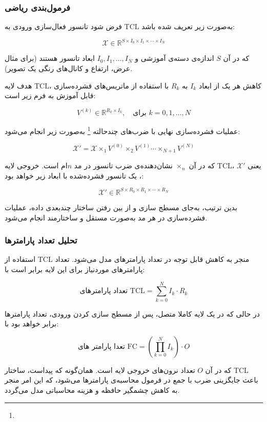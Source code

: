 \subsubsection*{فرمول‌بندی ریاضی}

فرض شود تانسور فعال‌سازی ورودی به TCL به‌صورت زیر تعریف شده باشد:

\[
\mathcal{X} \in \mathbb{R}^{S \times I_0 \times I_1 \times \cdots \times I_N}
\]

که در آن $S$ اندازه‌ی دسته‌ی آموزشی و $I_0, I_1, \dots, I_N$ ابعاد تانسور هستند (برای مثال عرض، ارتفاع و کانال‌های رنگی یک تصویر).

هدف لایه TCL، کاهش هر یک از ابعاد $I_k$ به $R_k$ با استفاده از ماتریس‌های فشرده‌سازی قابل آموزش به فرم زیر است:

\[
V^{(k)} \in \mathbb{R}^{R_k \times I_k}, \quad \text{برای } k = 0, 1, \dots, N
\]

عملیات فشرده‌سازی نهایی با ضرب‌های چندحالته \footnote{} به‌صورت زیر انجام می‌شود:

\[
\mathcal{X}' = \mathcal{X} \times_1 V^{(0)} \times_2 V^{(1)} \cdots \times_{N+1} V^{(N)}
\]

که در آن $\times_n$ نشان‌دهنده‌ی ضرب تانسور در مد $n$ام است. خروجی لایه TCL، یعنی $\mathcal{X}'$، یک تانسور فشرده‌شده با ابعاد زیر خواهد بود:

\[
\mathcal{X}' \in \mathbb{R}^{S \times R_0 \times R_1 \times \cdots \times R_N}
\]

بدین ترتیب، به‌جای مسطج سازی و از بین رفتن ساختار چندبعدی داده، عملیات فشرده‌سازی در هر مد به‌صورت مستقل و ساختارمند انجام می‌شود.







\subsubsection*{تحلیل تعداد پارامترها}

استفاده از TCL منجر به کاهش قابل توجه در تعداد پارامترهای مدل می‌شود. تعداد پارامترهای موردنیاز برای این لایه برابر است با:

\[
\text{تعداد پارامترهای TCL} = \sum_{k=0}^{N} I_k \cdot R_k
\]

در حالی که در یک لایه کاملا متصل، پس از مسطج سازی کردن ورودی، تعداد پارامترها برابر خواهد بود با:

\[
\text{تعدا پارامتر های FC} = \left( \prod_{k=0}^{N} I_k \right) \cdot O
\]

که در آن $O$ تعداد نرون‌های خروجی لایه است. همان‌گونه که پیداست، ساختار TCL باعث جایگزینی ضرب با جمع در فرمول محاسبه‌ی پارامترها می‌شود، که این امر منجر به کاهش چشمگیر حافظه و هزینه محاسباتی مدل می‌گردد.







